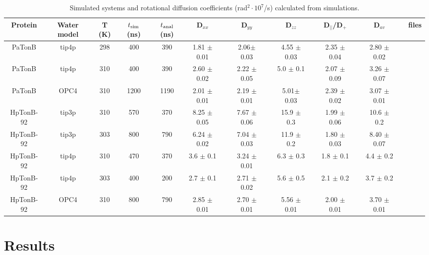 \documentclass[pre,aps,floatfix,authordate1-4,twocolumn]{revtex4-1}
\begin{document}
\begin{table}[htb]
\centering
\caption{Simulated systems and rotational diffusion coefficients (rad$^2\cdot 10^7$/s) calculated from simulations.
}\label{ROTdiffCOEFFS}
\begin{tabular}{c c c c c c c c c c c c c c c c}
Protein     & Water model & T (K)  &  $t_{\rm sim}$ (ns)   &  $t_{\rm anal}$ (ns)   & D$_{xx}$ &&D$_{yy}$ &&D$_{zz}$ &&D$_{||}$/D$_+$ & &D$_{av}$& &files \\
\hline
PaTonB      & tip4p       & 298    & 400                 &  390                 & 1.81 $\pm$ 0.01 && 2.06$\pm$ 0.03 && 4.55 $\pm$ 0.03 && 2.35 $\pm$ 0.04 && 2.80 $\pm$ 0.02 && \cite{??} \\
PaTonB      & tip4p       & 310    & 400                 &  390                 &  2.60 $\pm$ 0.02 &&  2.22 $\pm$ 0.05& &  5.0  $\pm$ 0.1  & &  2.07 $\pm$ 0.09& &   3.26 $\pm$  0.07 && \cite{??}\\
PaTonB      & OPC4        & 310    & 1200                &  1190                &  2.01 $\pm$ 0.01 && 2.19 $\pm$ 0.01 && 5.01$\pm$ 0.03 && 2.39 $\pm$ 0.02 && 3.07 $\pm$ 0.01 && \cite{??}  \\
HpTonB-92   & tip3p       & 310    & 570           	 &  370                 & 8.25 $\pm$ 0.05 && 7.67 $\pm$ 0.06 && 15.9 $\pm$ 0.3 && 1.99 $\pm$ 0.06 &&  10.6 $\pm$ 0.2 &&  \cite{??} \\
HpTonB-92   & tip3p       & 303    & 800           	 &  790                 & 6.24 $\pm$ 0.02 && 7.04 $\pm$ 0.03 && 11.9 $\pm$ 0.2 && 1.80 $\pm$ 0.03 && 8.40 $\pm$ 0.07 && \cite{??} \\
HpTonB-92   & tip4p       & 310    & 470           	 &  370                 & 3.6 $\pm$ 0.1 && 3.24 $\pm$ 0.01 && 6.3 $\pm$ 0.3 && 1.8 $\pm$ 0.1 && 4.4 $\pm$ 0.2 && \cite{??} \\
HpTonB-92   & tip4p       & 303    & 400           	 &  200                 & 2.7 $\pm$ 0.1 && 2.71 $\pm$ 0.02 && 5.6 $\pm$ 0.5 && 2.1 $\pm$ 0.2 && 3.7 $\pm$ 0.2 && \cite{??} \\
HpTonB-92   & OPC4        & 310    & 800           	 &  790                 & 2.85 $\pm$ 0.01 && 2.70 $\pm$ 0.01 && 5.56 $\pm$ 0.01 && 2.00 $\pm$ 0.01 && 3.70 $\pm$ 0.01 && \cite{??} \\
\end{tabular}
\end{table}

\section{Results}
\end{document}
